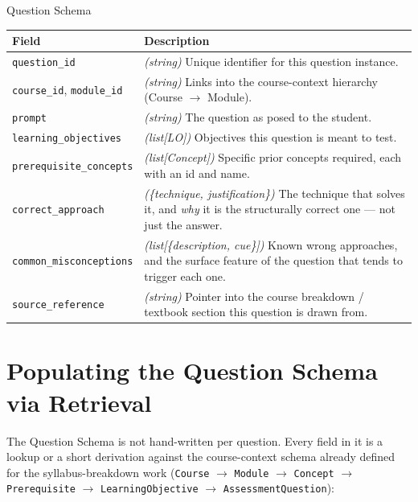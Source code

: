 \documentclass[11pt]{article}
\begin{document}
\begin{questionbox}{Question Schema}
\small
\begin{tabularx}{\linewidth}{P{4.0cm} X}
\toprule
\textbf{Field} & \textbf{Description} \\
\midrule
\texttt{question\_\allowbreak id} & \textit{(string)} Unique identifier for this question instance. \\
\texttt{course\_\allowbreak id}, \texttt{module\_\allowbreak id} & \textit{(string)} Links into the course-context hierarchy (Course $\to$ Module). \\
\texttt{prompt} & \textit{(string)} The question as posed to the student. \\
\texttt{learning\_\allowbreak objectives} & \textit{(list[LO])} Objectives this question is meant to test. \\
\texttt{prerequisite\_\allowbreak concepts} & \textit{(list[Concept])} Specific prior concepts required, each with an id and name. \\
\texttt{correct\_\allowbreak approach} & \textit{(\{technique, justification\})} The technique that solves it, and \emph{why} it is the structurally correct one --- not just the answer. \\
\texttt{common\_\allowbreak misconceptions} & \textit{(list[\{description, cue\}])} Known wrong approaches, and the surface feature of the question that tends to trigger each one. \\
\texttt{source\_\allowbreak reference} & \textit{(string)} Pointer into the course breakdown / textbook section this question is drawn from. \\
\bottomrule
\end{tabularx}
\end{questionbox}

\section{Populating the Question Schema via Retrieval}

The Question Schema is not hand-written per question. Every field in it is a
lookup or a short derivation against the course-context schema already
defined for the syllabus-breakdown work (\texttt{Course} $\to$
\texttt{Module} $\to$ \texttt{Concept} $\to$ \texttt{Prerequisite} $\to$
\texttt{LearningObjective} $\to$ \texttt{AssessmentQuestion}):
\end{document}
